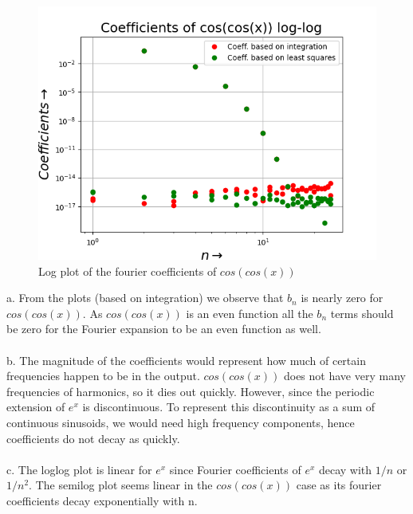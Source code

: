 \documentclass[11pt, a4paper]{article}
\begin{document}
	\begin{figure}[!tbh]
   	\centering
   	\includegraphics[scale=0.6]{Figure_6.png}   
   	\caption{Log plot of the fourier coefficients of $cos(cos(x))$}
   	\label{fig:sample}
   \end{figure} 

a. From the plots (based on integration) we observe that $b_n$ is nearly zero for $cos(cos(x))$. As $cos(cos(x))$ is an even function all the $b_n$ terms should be zero for the Fourier expansion to be an even function as well.\\\\
b. The magnitude of the coefficients would represent how much of certain frequencies happen to be in the output. $cos(cos(x))$ does not have very many frequencies of harmonics, so it dies out quickly. However, since the periodic extension of $e^{x}$ is discontinuous. To represent this discontinuity as a sum of continuous sinusoids, we would need high frequency components, hence coefficients do not decay as quickly.\\\\
c. The loglog plot is linear for $e^{x}$ since Fourier coefficients of $e^{x}$ decay with $1/n$ or $1/n^{2}$. The semilog plot seems linear in the $cos(cos(x))$ case as its fourier coefficients decay exponentially with n.
\end{document}
